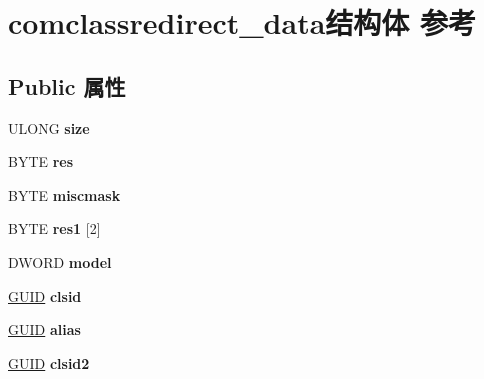 \hypertarget{structcomclassredirect__data}{}\section{comclassredirect\+\_\+data结构体 参考}
\label{structcomclassredirect__data}
\subsection*{Public 属性}
\begin{DoxyCompactItemize}
\item 
\mbox{\label{structcomclassredirect__data_a029e172a3ce245afa8ee4ac7ab7832f9}} 
U\+L\+O\+NG {\bfseries size}
\item 
\mbox{\label{structcomclassredirect__data_a372253f95e9ffe898ca5f6bf0ab7d833}} 
B\+Y\+TE {\bfseries res}
\item 
\mbox{\label{structcomclassredirect__data_a1a276e7393c9900e598a4b1db64daa18}} 
B\+Y\+TE {\bfseries miscmask}
\item 
\mbox{\label{structcomclassredirect__data_a4c9285387f017276a7de465de447c005}} 
B\+Y\+TE {\bfseries res1} \mbox{[}2\mbox{]}
\item 
\mbox{\label{structcomclassredirect__data_ae8a6947804a1410153dbb25ed4ed5ce8}} 
D\+W\+O\+RD {\bfseries model}
\item 
\mbox{\label{structcomclassredirect__data_a89a8c697121ddc01a386eae0d107ddbb}} 
\hyperlink{interface_g_u_i_d}{G\+U\+ID} {\bfseries clsid}
\item 
\mbox{\label{structcomclassredirect__data_aff9f5608c009034feb6840e3c09f6575}} 
\hyperlink{interface_g_u_i_d}{G\+U\+ID} {\bfseries alias}
\item 
\mbox{\label{structcomclassredirect__data_a979af655f7a24ffc41e4025d0b7139a3}} 
\hyperlink{interface_g_u_i_d}{G\+U\+ID} {\bfseries clsid2}
\item 

\end{DoxyCompactItemize}
